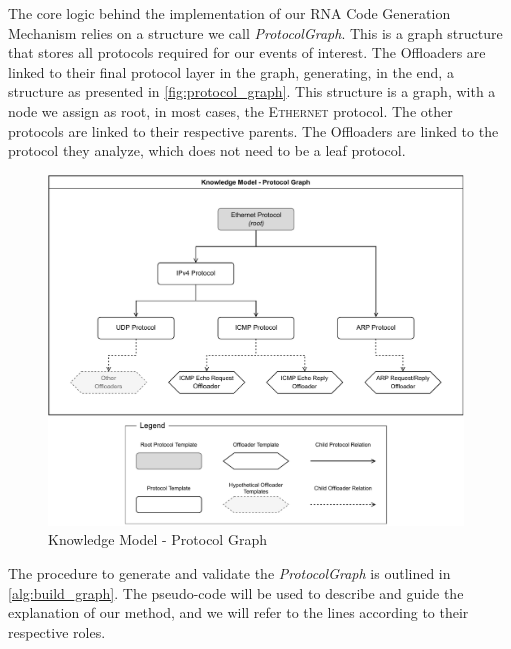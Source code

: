 The core logic behind the implementation of our RNA Code Generation Mechanism relies on a structure we call \textit{ProtocolGraph}. This is a graph structure that stores all protocols required for our events of interest. The Offloaders are linked to their final protocol layer in the graph, generating, in the end, a structure as presented in \autoref{fig:protocol_graph}. This structure is a graph, with a node we assign as root, in most cases, the \textsc{Ethernet} protocol. The other protocols are linked to their respective parents. The Offloaders are linked to the protocol they analyze, which does not need to be a leaf protocol.

\begin{figure}[htb]
    \caption{Knowledge Model - Protocol Graph}
    \begin{center}
        \includegraphics[width=0.98\textwidth]{images/icmp_ex_protocol_graph.pdf}  
    \end{center}
    \label{fig:protocol_graph}
\end{figure}

The procedure to generate and validate the \textit{ProtocolGraph} is outlined in \autoref{alg:build_graph}. The pseudo-code will be used to describe and guide the explanation of our method, and we will refer to the lines according to their respective roles.

